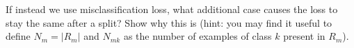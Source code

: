 \item {} If instead we use misclassification loss, what additional case causes the loss to stay the same after a split?  Show why this is (hint: you may find it useful to define $N_m = \lvert R_m \rvert$ and $N_{mk}$ as the number of examples of class $k$ present in $R_m$).